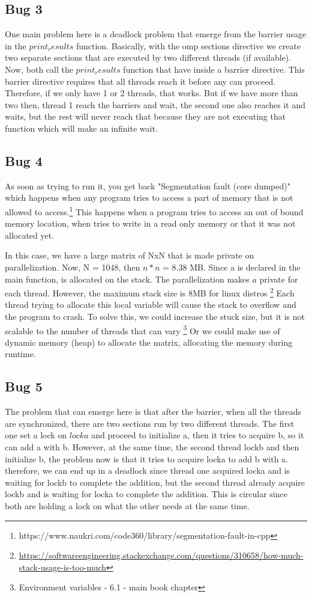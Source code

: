 \documentclass[unicode,11pt,a4paper,oneside,numbers=endperiod,openany]{scrartcl}
\begin{document}
\subsection{Bug 3}
One main problem here is a deadlock problem that emerge from the barrier usage in the $print_results$ function. 
Basically, with the omp sections directive we create two separate sections that are executed by two different threads (if available). 
Now, both call the $print_results$ function that have inside a barrier directive. 
This barrier directive requires that all threads reach it before any can proceed. 
Therefore, if we only have 1 or 2 threads, that works. But if we have more than two
then, thread 1 reach the barriers and wait, the second one also reaches it and waits, but the rest
will never reach that because they are not executing that function which will make an infinite wait. 
\subsection{Bug 4}
As soon as trying to run it, you get back "Segmentation fault (core dumped)" which happens when any program
tries to access a part of memory that is not allowed to access.\footnote{https://www.naukri.com/code360/library/segmentation-fault-in-cpp}
This happens when a program tries to access an out of bound memory location, when tries to write in a read only memory or that it was not allocated yet. 

In this case, we have a large matrix of NxN that is made private on parallelization. Now, N = 1048, then $n*n$ =  8.38 MB.
Since a is declared in the main function, is allocated on the stack. The parallelization makes $a$ private for each thread.
However, the maximum stack size is 8MB for linux distros \footnote{\url{https://softwareengineering.stackexchange.com/questions/310658/how-much-stack-usage-is-too-much}} 
Each thread trying to allocate this local variable will cause the stack to overflow and the program to crash.
To solve this, we could increase the stuck size, but it is not scalable to the number of threads that can vary \footnote{Environment variables - 6.1 - main book chapter}
Or we could make use of dynamic memory (heap) to allocate the matrix, allocating the memory during runtime.
\subsection{Bug 5}
The problem that can emerge here is that after the barrier, when all the threads are synchronized, there are two sections run by 
two different threads. The first one set a lock on $locka$ and proceed to initialize a, then it tries to acquire b, so it can add a with b. 
However, at the same time, the second thread lockb and then initialize b, the problem now is that it tries to acquire locka to add b with a. 
therefore, we can end up in a deadlock since thread one acquired locka and is waiting for lockb to complete the addition, but the second thread already acquire 
lockb and is waiting for locka to complete the addition. This is circular since both are holding a lock on what the other needs at the same time.
\end{document}
